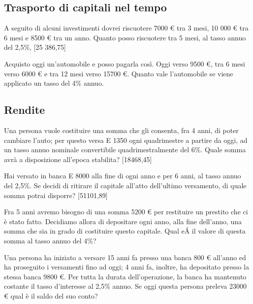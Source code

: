 \subsection{Trasporto di capitali nel tempo}
\begin{esercizio}
A seguito di alcuni investimenti dovrei riscuotere 7000 € tra 3 mesi, 10 
000 € tra 6 mesi e 8500 € tra un anno. Quanto posso riscuotere tra 5 mesi, 
al tasso annuo del 2,5\%,
\hfill[25 386,75]
\end{esercizio}

\begin{esercizio}
Acquisto oggi un'automobile e posso pagarla così. Oggi verso 9500 €, tra 6 
mesi verso 6000 € e tra 12 mesi verso 15700 €. Quanto vale l'automobile se 
viene applicato un tasso del 4\% annuo.
\end{esercizio}


\subsection{Rendite}
\begin{esercizio}
Una persona vuole costituire una somma che gli consenta, fra 4 anni, di 
poter cambiare l'auto; per questo versa E 1350 ogni quadrimestre a partire 
da oggi, ad un tasso annuo nominale convertibile quadrimestralmente del 
6\%. Quale somma avrà a disposizione all'epoca stabilita?
\hfill[18468,45]
\end{esercizio}
\begin{esercizio}
Hai versato in banca E 8000 alla fine di ogni anno e per 6 anni, al tasso 
annuo del 2,5\%. Se decidi di
ritirare il capitale all'atto dell'ultimo versamento, di quale somma potrai 
disporre?
\hfill[51101,89]
\end{esercizio}
\begin{esercizio}
Fra 5 anni avremo bisogno di una somma 5200 € per restituire un prestito 
che ci è stato fatto. Decidiamo
allora di depositare ogni anno, alla fine dell'anno, una somma che sia in 
grado di costituire questo capitale. Qual eÁ il valore di questa somma al 
tasso annuo del 4\%?
\end{esercizio}
\begin{esercizio}
Una persona ha iniziato a versare 15 anni fa presso una banca 800 € 
all'anno ed ha proseguito i versamenti fino ad oggi; 4 anni fa, inoltre, ha 
depositato presso la stessa banca 9800 €. Per tutta la durata
dell'operazione, la banca ha mantenuto costante il tasso d'interesse al 
2,5\% annuo. Se oggi questa persona preleva 23000 € qual è il saldo del suo 
conto?

\end{esercizio}

